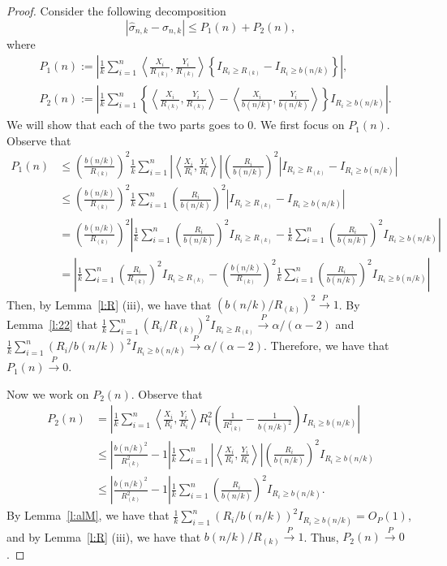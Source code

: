 \documentclass[lineno]{biometrika}
\newcommand \ag{\alpha}
\newcommand \sg{\sigma}
\newcommand\lp{\left (}
\newcommand\rp{\right )}
\newcommand\lmo{\left |}
\newcommand\rmo{\right |}
\newcommand\lbr{\left \{}
\newcommand\rbr{\right \}}
\newcommand\lip{\left \langle}
\newcommand\rip{\right \rangle}
\def\convP{\stackrel{\mbox{$\scriptstyle P$}}{\rightarrow}}
\begin{document}
\begin{proof}
Consider the following decomposition
\[
|\hat{\sg}_{n,k} - \sg_{n,k} | \le P_1(n) + P_2(n),
\]
where
\begin{align*}
&P_1(n) :=\lmo \frac{1}{k}\sum_{i=1}^n \lip \frac{X_i}{R_{(k)}}, \frac{Y_i}{R_{(k)}} \rip  \lbr I_{R_i \ge R_{(k)} } - I_{R_i \ge b(n/k) }\rbr \rmo,\\
&P_2(n) :=\lmo \frac{1}{k}\sum_{i=1}^n \lbr \lip \frac{X_i}{R_{(k)}}, \frac{Y_i}{R_{(k)}} \rip - \lip \frac{X_i}{b(n/k)}, \frac{Y_i}{b(n/k)} \rip \rbr
 I_{R_i \ge b(n/k) } \rmo.
\end{align*}
We will show that each of the two parts goes to 0. We first focus on $P_1(n)$. Observe that
\begin{align*}
P_1(n) &\le \lp\frac{b(n/k)}{R_{(k)}} \rp^2  \frac{1}{k}\sum_{i=1}^n  \lmo \lip \frac{X_i}{R_i}, \frac{Y_i}{R_i} \rip \rmo \lp \frac{R_i}{b(n/k)} \rp^{2} \lmo  I_{R_i \ge R_{(k)} } - I_{R_i \ge b(n/k) } \rmo \\
&\le \lp\frac{b(n/k)}{R_{(k)}} \rp^2  \frac{1}{k}\sum_{i=1}^n  \lp \frac{R_i}{b(n/k)} \rp^{2} \lmo  I_{R_i \ge R_{(k)} } - I_{R_i \ge b(n/k) } \rmo \\
& =  \lp\frac{b(n/k)}{R_{(k)}} \rp^2 \lmo \frac{1}{k}\sum_{i=1}^n \lp \frac{R_i}{b(n/k)} \rp^{2}   I_{R_i \ge R_{(k)} } - \frac{1}{k}\sum_{i=1}^n \lp \frac{R_i}{b(n/k)} \rp^{2}   I_{R_i \ge b(n/k) } \rmo \\
& =  \lmo \frac{1}{k}\sum_{i=1}^n \lp \frac{R_i}{R_{(k)}} \rp^{2}   I_{R_i \ge R_{(k)} } - \lp\frac{b(n/k)}{R_{(k)}} \rp^2  \frac{1}{k}\sum_{i=1}^n \lp \frac{R_i}{b(n/k)} \rp^{2}   I_{R_i \ge b(n/k) } \rmo
\end{align*}
Then, by Lemma~\ref{l:R} (iii), we have that $\lp {b(n/k)}/{R_{(k)}} \rp^2 \convP 1$. By Lemma~\ref{l:22} that $\frac{1}{k}\sum_{i=1}^n \lp{R_i}/{R_{(k)}} \rp^{2}   I_{R_i \ge R_{(k)} } \convP \ag/(\ag-2)$ and $\frac{1}{k}\sum_{i=1}^n \lp {R_i}/{b(n/k)} \rp^{2}   I_{R_i \ge b(n/k) }\convP \ag/(\ag-2)$. Therefore, we have that  $P_1(n) \convP 0$.

Now we work on $P_2(n)$. Observe that
\begin{align*}
P_2(n) & = \lmo \frac{1}{k}\sum_{i=1}^n \lip \frac{X_i}{R_i}, \frac{Y_i}{R_i} \rip R_i^2 \lp \frac{1}{R_{(k)}^2} - \frac{1}{b(n/k)^2}\rp
 I_{R_i \ge b(n/k) } \rmo \\
& \le  \lmo \frac{b(n/k)^2}{R_{(k)}^2} - 1 \rmo  \frac{1}{k}\sum_{i=1}^n  \lmo \lip \frac{X_i}{R_i}, \frac{Y_i}{R_i}  \rip \rmo \lp \frac{R_i}{b(n/k)} \rp^{2}
 I_{R_i \ge b(n/k)} \\
 & \le  \lmo \frac{b(n/k)^2}{R_{(k)}^2} - 1 \rmo  \frac{1}{k}\sum_{i=1}^n \lp \frac{R_i}{b(n/k)} \rp^{2} I_{R_i \ge b(n/k)}.
\end{align*}
By Lemma~\ref{l:alM}, we have that $\frac{1}{k}\sum_{i=1}^n \lp {R_i}/{b(n/k)} \rp^{2} I_{R_i \ge b(n/k)} = O_P(1)$, and by Lemma~\ref{l:R} (iii), we have that $b(n/k) / R_{(k)} \convP 1$. Thus, $P_2(n) \convP 0$.
\end{proof}
\end{document}
